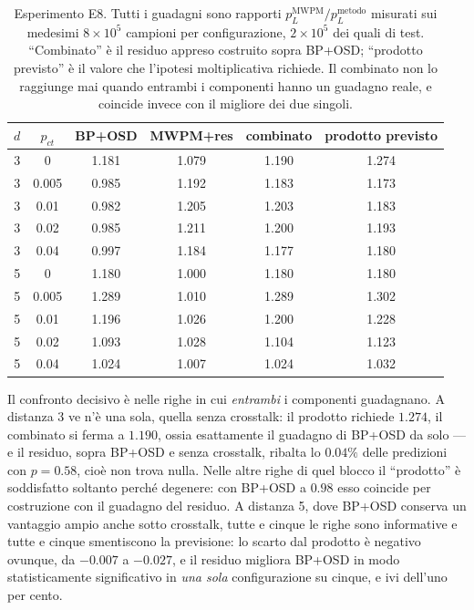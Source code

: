 \begin{table}[H]
\centering
\small
\begin{tabular}{ccccc c}
\toprule
$d$ & $p_{ct}$ & \textbf{BP+OSD} & \textbf{MWPM+res} & \textbf{combinato} & \textbf{prodotto previsto} \\
\midrule
3 & 0      & 1.181 & 1.079 & 1.190 & 1.274 \\
3 & 0.005  & 0.985 & 1.192 & 1.183 & 1.173 \\
3 & 0.01   & 0.982 & 1.205 & 1.203 & 1.183 \\
3 & 0.02   & 0.985 & 1.211 & 1.200 & 1.193 \\
3 & 0.04   & 0.997 & 1.184 & 1.177 & 1.180 \\
\midrule
5 & 0      & 1.180 & 1.000 & 1.180 & 1.180 \\
5 & 0.005  & 1.289 & 1.010 & 1.289 & 1.302 \\
5 & 0.01   & 1.196 & 1.026 & 1.200 & 1.228 \\
5 & 0.02   & 1.093 & 1.028 & 1.104 & 1.123 \\
5 & 0.04   & 1.024 & 1.007 & 1.024 & 1.032 \\
\bottomrule
\end{tabular}
\caption[Il residuo appreso costruito sopra BP+OSD]{Esperimento E8. Tutti i guadagni sono rapporti $p_L^{\text{MWPM}}/p_L^{\text{metodo}}$ misurati sui medesimi $8\times10^5$ campioni per configurazione, $2\times10^5$ dei quali di test. ``Combinato'' è il residuo appreso costruito sopra BP+OSD; ``prodotto previsto'' è il valore che l'ipotesi moltiplicativa richiede. Il combinato non lo raggiunge mai quando entrambi i componenti hanno un guadagno reale, e coincide invece con il migliore dei due singoli.}
\label{tab:neural_e8}
\end{table}

Il confronto decisivo è nelle righe in cui \emph{entrambi} i componenti guadagnano. A distanza 3 ve n'è una sola, quella senza crosstalk: il prodotto richiede $1.274$, il combinato si ferma a $1.190$, ossia esattamente il guadagno di BP+OSD da solo --- e il residuo, sopra BP+OSD e senza crosstalk, ribalta lo $0.04\%$ delle predizioni con $p = 0.58$, cioè non trova nulla. Nelle altre righe di quel blocco il ``prodotto'' è soddisfatto soltanto perché degenere: con BP+OSD a $0.98$ esso coincide per costruzione con il guadagno del residuo. A distanza 5, dove BP+OSD conserva un vantaggio ampio anche sotto crosstalk, tutte e cinque le righe sono informative e tutte e cinque smentiscono la previsione: lo scarto dal prodotto è negativo ovunque, da $-0.007$ a $-0.027$, e il residuo migliora BP+OSD in modo statisticamente significativo in \emph{una sola} configurazione su cinque, e ivi dell'uno per cento.

